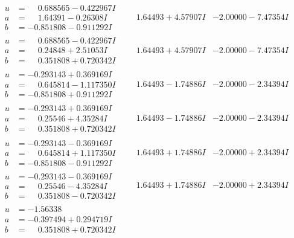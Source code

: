\documentclass[1p]{elsarticle_modified}
\theoremstyle{definition}
\begin{document}
$$\begin{array}{c|c|c}
\begin{aligned}
u &= \phantom{-}0.688565 - 0.422967 I \\
a &= \phantom{-}1.64391 - 0.26308 I \\
b &= -0.851808 - 0.911292 I\end{aligned}
 & \phantom{-}1.64493 + 4.57907 I & -2.00000 - 7.47354 I \\ \hline\begin{aligned}
u &= \phantom{-}0.688565 - 0.422967 I \\
a &= \phantom{-}0.24848 + 2.51053 I \\
b &= \phantom{-}0.351808 + 0.720342 I\end{aligned}
 & \phantom{-}1.64493 + 4.57907 I & -2.00000 - 7.47354 I \\ \hline\begin{aligned}
u &= -0.293143 + 0.369169 I \\
a &= \phantom{-}0.645814 - 1.117350 I \\
b &= -0.851808 + 0.911292 I\end{aligned}
 & \phantom{-}1.64493 - 1.74886 I & -2.00000 - 2.34394 I \\ \hline\begin{aligned}
u &= -0.293143 + 0.369169 I \\
a &= \phantom{-}0.25546 + 4.35284 I \\
b &= \phantom{-}0.351808 + 0.720342 I\end{aligned}
 & \phantom{-}1.64493 - 1.74886 I & -2.00000 - 2.34394 I \\ \hline\begin{aligned}
u &= -0.293143 - 0.369169 I \\
a &= \phantom{-}0.645814 + 1.117350 I \\
b &= -0.851808 - 0.911292 I\end{aligned}
 & \phantom{-}1.64493 + 1.74886 I & -2.00000 + 2.34394 I \\ \hline\begin{aligned}
u &= -0.293143 - 0.369169 I \\
a &= \phantom{-}0.25546 - 4.35284 I \\
b &= \phantom{-}0.351808 - 0.720342 I\end{aligned}
 & \phantom{-}1.64493 + 1.74886 I & -2.00000 + 2.34394 I \\ \hline\begin{aligned}
u &= -1.56338\phantom{ +0.000000I} \\
a &= -0.397494 + 0.294719 I \\
b &= \phantom{-}0.351808 + 0.720342 I\end{aligned}

\end{array}$$
\end{document}
